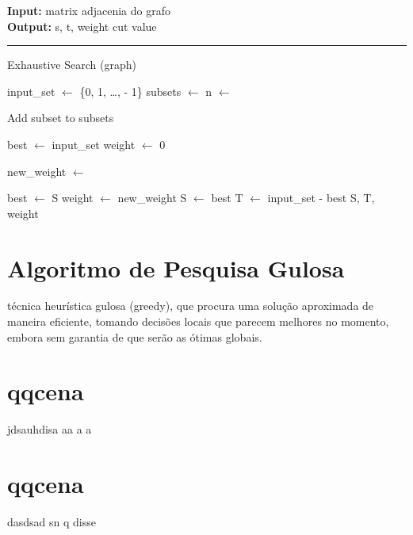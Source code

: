 \documentclass[mirror]{revdetua}
\begin{document}
\begin{algorithm}
    \raggedright
    \textbf{Input:} matrix adjacenia do grafo \\
    \textbf{Output:} s, t, weight cut value \\
    \hrule 
    \caption{Exhaustive Search (graph)}
    \begin{algorithmic}[1]
        \State input\_set $\gets$ \{0, 1, \ldots,  - 1\}
        \State subsets $\gets$ 
        \State n $\gets$ 
        
            \State Add subset to subsets
            \EndFor
        \EndFor
        
        \State best $\gets$ input\_set
        \State weight $\gets$ 0
        
            \State new\_weight $\gets$ 
            
            \State best $\gets$ S
            \State weight $\gets$ new\_weight
            \EndIf
        \EndFor
        \State S $\gets$ best
        \State T $\gets$ input\_set - best
        \State \Return S, T, weight
    \end{algorithmic}
\end{algorithm}



\section{Algoritmo de Pesquisa Gulosa}

técnica heurística gulosa (greedy), que procura uma solução aproximada de maneira eficiente, tomando decisões locais que parecem melhores no momento, embora sem garantia de que serão as ótimas globais.

\section{qqcena}

jdsauhdisa
aa a a
\section{qqcena}
dasdsad sn q disse


\end{document}
